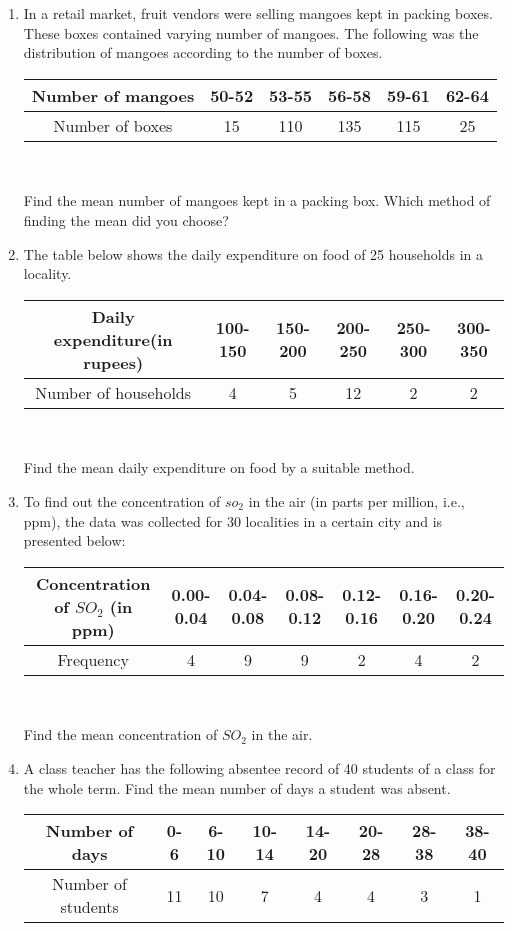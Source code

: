\begin{enumerate}[label=\arabic*.,ref=\thesubsection.\theenumi]
\item In a retail market, fruit vendors were selling mangoes kept in packing boxes. These
boxes contained varying number of mangoes. The following was the distribution of
mangoes according to the number of boxes.
\begin{tabular}{|c|c|c|c|c|c|}
\hline
Number of mangoes&50-52&53-55&56-58&59-61&62-64\\
\hline
Number of boxes&15&110&135&115&25\\
\hline
\end{tabular}\\
\par Find the mean number of mangoes kept in a packing box. Which method of finding
the mean did you choose?
\item The table below shows the daily expenditure on food of 25 households in a locality.
\begin{tabular}{|c|c|c|c|c|c|}
\hline
Daily expenditure(in rupees)&100-150&150-200&200-250&250-300&300-350 \\
\hline
Number of households&4&5&12&2&2\\
\hline
\end{tabular}\\
\par Find the mean daily expenditure on food by a suitable method.
\item To find out the concentration of $so_2$ in the air (in parts per million, i.e., ppm), the data was collected for 30 localities in a certain city and is presented below:
\begin{tabular}{|c|c|c|c|c|c|c|}
\hline
Concentration of $SO_2$ (in ppm)&0.00-0.04&0.04-0.08&0.08-0.12&0.12-0.16&0.16-0.20& 
0.20-0.24 \\
\hline
Frequency&4&9&9&2&4&2\\
\hline
\end{tabular}\\
\par Find the mean concentration of $SO_2$ in the air.
\item A class teacher has the following absentee record of 40 students of a class for the whole
term. Find the mean number of days a student was absent.
\begin{tabular}{|c|c|c|c|c|c|c|c|}
\hline
Number of days&0-6&6-10&10-14&14-20&20-28&28-38&38-40 \\
\hline
Number of students&11&10&7&4&4&3&1\\
\hline
\end{tabular}\\

\end{enumerate}
